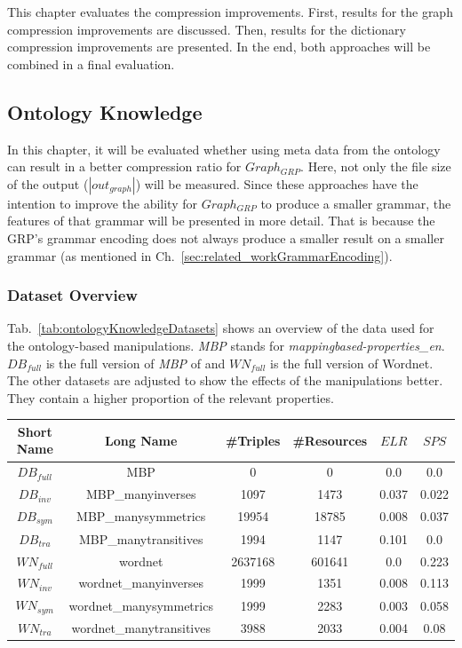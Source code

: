This chapter evaluates the compression improvements. First, results for the graph compression improvements  are discussed. Then, results for the dictionary compression improvements are presented.  In the end, both approaches will be combined in a final evaluation.

\subsection{Ontology Knowledge}\label{sec:evaluationOntKnowledge}

In this chapter, it will be evaluated whether using meta data from the ontology can result in a better compression ratio for $Graph_{GRP}$. Here, not only the file size of the output ($|out_{graph}|$) will be measured. Since these approaches have the intention to improve the ability for $Graph_{GRP}$ to produce a smaller grammar, the features of that grammar will be presented in more detail. That is because the GRP's grammar encoding does not always produce a smaller result on a smaller grammar (as mentioned in Ch.~\ref{sec:related_workGrammarEncoding}).

\subsubsection{Dataset Overview}

Tab.~\ref{tab:ontologyKnowledgeDatasets} shows an overview of the data used for the ontology-based manipulations. \textit{MBP} stands for \textit{mappingbased-properties\_en}. $DB_{full}$ is the full version of \textit{MBP} of and $WN_{full}$ is the full version of Wordnet. The other datasets are adjusted to show the effects of the manipulations better. They contain a higher proportion of the relevant properties.

\begin{center}
	\begin{tabular}{|c|c|c|c|c|c|}
		\hline 
		Short Name & Long Name & \#Triples & \#Resources & $ELR$ & $SPS$ \\ 
	    \hline
		$DB_{full}$ & MBP& 0 & 0 & 0.0 & 0.0 \\
		\hline
	    $DB_{inv}$ & MBP\_manyinverses & 1097 & 1473 & 0.037 & 0.022 \\
		\hline
		$DB_{sym}$ & MBP\_manysymmetrics & 19954 & 18785 & 0.008 & 0.037 \\
		\hline
		$DB_{tra}$ & MBP\_manytransitives & 1994 & 1147 & 0.101 & 0.0 \\
		\hline
		\hline
		$WN_{full}$ & wordnet & 2637168 & 601641 & 0.0 & 0.223 \\
		\hline
		$WN_{inv}$ & wordnet\_manyinverses & 1999 & 1351 & 0.008 & 0.113 \\
		\hline
		$WN_{sym}$ & wordnet\_manysymmetrics & 1999 & 2283 & 0.003 & 0.058 \\
		\hline
		$WN_{tra}$ & wordnet\_manytransitives & 3988 & 2033 & 0.004 & 0.08 \\
		\hline
	\end{tabular} 
	\label{tab:ontologyKnowledgeDatasets}
\end{center}

